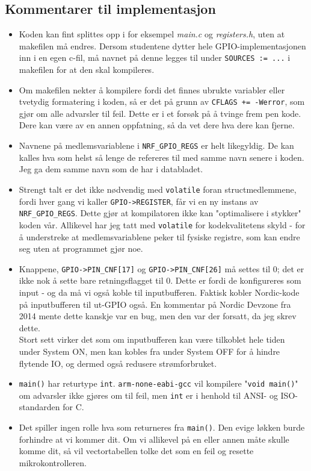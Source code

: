 \documentclass[11pt,a4paper]{article}
\begin{document}
\subsection{Kommentarer til implementasjon}
\begin{itemize}
\item Koden kan fint splittes opp i for eksempel \textit{main.c} og \textit{registers.h}, uten at makefilen må endres. Dersom studentene dytter hele GPIO-implementasjonen inn i en egen c-fil, må navnet på denne legges til under \texttt{SOURCES := ...} i makefilen for at den skal kompileres.
\item Om makefilen nekter å kompilere fordi det finnes ubrukte variabler eller tvetydig formatering i koden, så er det på grunn av \texttt{CFLAGS += -Werror}, som gjør om alle advarsler til feil. Dette er i et forsøk på å tvinge frem pen kode. Dere kan være av en annen oppfatning, så da vet dere hva dere kan fjerne.
\item Navnene på medlemsvariablene i \texttt{NRF_GPIO_REGS} er helt likegyldig. De kan kalles hva som helst så lenge de refereres til med samme navn senere i koden. Jeg ga dem samme navn som de har i databladet.
\item Strengt talt er det ikke nødvendig med \texttt{volatile} foran structmedlemmene, fordi hver gang vi kaller \texttt{GPIO->REGISTER}, får vi en ny instans av \texttt{NRF_GPIO_REGS}. Dette gjør at kompilatoren ikke kan "optimalisere i stykker" koden vår. Allikevel har jeg tatt med \texttt{volatile} for kodekvalitetens skyld - for å understreke at medlemsvariablene peker til fysiske registre, som kan endre seg uten at programmet gjør noe.
\item Knappene, \texttt{GPIO->PIN_CNF[17]} og \texttt{GPIO->PIN_CNF[26]} må settes til 0; det er ikke nok å sette bare retningsflagget til 0. Dette er fordi de konfigureres som input - og da må vi også koble til inputbufferen. Faktisk kobler Nordic-kode på inputbufferen til ut-GPIO også. En kommentar på Nordic Devzone fra 2014 mente dette kanskje var en bug, men den var der forsatt, da jeg skrev dette.\\
Stort sett virker det som om inputbufferen kan være tilkoblet hele tiden under System ON, men kan kobles fra under System OFF for å hindre flytende IO, og dermed også redusere strømforbruket.
\item \texttt{main()} har returtype \texttt{int}. \texttt{arm-none-eabi-gcc} vil kompilere "\texttt{void main()}" om advarsler ikke gjøres om til feil, men \texttt{int} er i henhold til ANSI- og ISO-standarden for C.
\item Det spiller ingen rolle hva som returneres fra \texttt{main()}. Den evige løkken burde forhindre at vi kommer dit. Om vi allikevel på en eller annen måte skulle komme dit, så vil vectortabellen tolke det som en feil og resette mikrokontrolleren.
\end{itemize}
\end{document}
